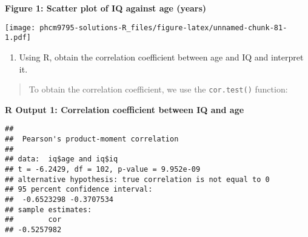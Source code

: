 \documentclass[
]{memoir}
\newenvironment{Shaded}{\begin{snugshade}}{\end{snugshade}}
\newcommand{\AttributeTok}[1]{\textcolor[rgb]{0.77,0.63,0.00}{#1}}
\newcommand{\FunctionTok}[1]{\textcolor[rgb]{0.00,0.00,0.00}{#1}}
\newcommand{\NormalTok}[1]{#1}
\newcommand{\OtherTok}[1]{\textcolor[rgb]{0.56,0.35,0.01}{#1}}
\newcommand{\SpecialCharTok}[1]{\textcolor[rgb]{0.00,0.00,0.00}{#1}}
\newcommand{\StringTok}[1]{\textcolor[rgb]{0.31,0.60,0.02}{#1}}
\providecommand{\tightlist}{%
  \setlength{\itemsep}{0pt}\setlength{\parskip}{0pt}}
\begin{document}
\textbf{Figure 1: Scatter plot of IQ against age (years)}

\begin{Shaded}
\end{Shaded}

\texttt{[image: phcm9795-solutions-R\_files/figure-latex/unnamed-chunk-81-1.pdf]}

\begin{enumerate}
\def\labelenumi{\alph{enumi})}
\setcounter{enumi}{2}
\tightlist
\item
  Using R, obtain the correlation coefficient between age and IQ and interpret it.
\end{enumerate}

\begin{quote}
To obtain the correlation coefficient, we use the \texttt{cor.test()} function:
\end{quote}

\textbf{R Output 1: Correlation coefficient between IQ and age}

\begin{Shaded}
\end{Shaded}

\begin{verbatim}
## 
##  Pearson's product-moment correlation
## 
## data:  iq$age and iq$iq
## t = -6.2429, df = 102, p-value = 9.952e-09
## alternative hypothesis: true correlation is not equal to 0
## 95 percent confidence interval:
##  -0.6523298 -0.3707534
## sample estimates:
##        cor 
## -0.5257982
\end{verbatim}
\end{document}
